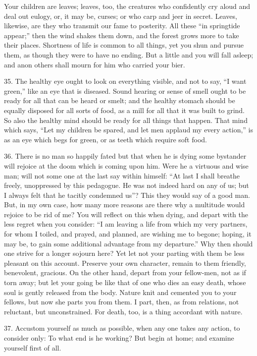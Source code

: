 \documentclass{book}
\begin{document}
Your children are leaves; leaves, too, the creatures who confidently
cry aloud and deal out eulogy, or, it may be, curses; or who carp and
jeer in secret. Leaves, likewise, are they who transmit our fame to
posterity. All these ``in springtide appear;'' then the wind shakes them
down, and the forest grows more to take their places. Shortness of
life is common to all things, yet you shun and pursue them, as though
they were to have no ending. But a little and you will fall asleep;
and anon others shall mourn for him who carried your bier.

35. The healthy eye ought to look on everything visible, and not to
say, ``I want green,'' like an eye that is diseased. Sound hearing or
sense of smell ought to be ready for all that can be heard or smelt;
and the healthy stomach should be equally disposed for all sorts of
food, as a mill for all that it was built to grind. So also the
healthy mind should be ready for all things that happen. That mind
which says, ``Let my children be spared, and let men applaud my every
action,'' is as an eye which begs for green, or as teeth which require
soft food.

36. There is no man so happily fated but that when he is dying some
bystander will rejoice at the doom which is coming upon him. Were he a
virtuous and wise man; will not some one at the last say within
himself: ``At last I shall breathe freely, unoppressed by this
pedagogue. He was not indeed hard on any of us; but I always felt that
he tacitly condemned us''? This they would say of a good man. But, in
my own case, how many more reasons are there why a multitude would
rejoice to be rid of me? You will reflect on this when dying, and
depart with the less regret when you consider: ``I am leaving a life
from which my very partners, for whom I toiled, and prayed, and
planned, are wishing me to begone; hoping, it may be, to gain some
additional advantage from my departure.'' Why then should one strive
for a longer sojourn here? Yet let not your parting with them be less
pleasant on this account. Preserve your own character, remain to them
friendly, benevolent, gracious. On the other hand, depart from your
fellow-men, not as if torn away; but let your going be like that of
one who dies an easy death, whose soul is gently released from the
body. Nature knit and cemented you to your fellows, but now she parts
you from them. I part, then, as from relations, not reluctant, but
unconstrained. For death, too, is a thing accordant with nature.

37. Accustom yourself as much as possible, when any one takes any
action, to consider only: To what end is he working? But begin at
home; and examine yourself first of all.
\end{document}
